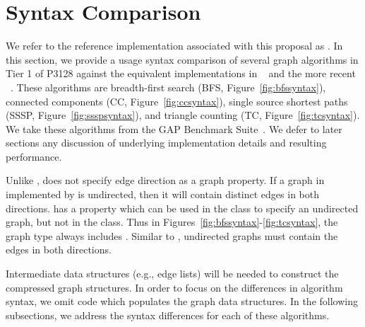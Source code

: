 \clearpage

\section{Syntax Comparison} \label{syntax}
We refer to the reference implementation associated with this proposal as 
\stdgraph. In this section, we provide a usage syntax comparison of several 
graph algorithms in Tier 1 of P3128 against the equivalent implementations in 
\bgl~\cite{BGL} and the more recent \nwgraph~\cite{REF_nwgraph_paper,REF_nwgraph_library}.
These algorithms are breadth-first search (BFS, Figure~\ref{fig:bfssyntax}),
connected components (CC, Figure~\ref{fig:ccsyntax}),
single source shortest paths (SSSP, Figure~\ref{fig:ssspsyntax}),
and triangle counting (TC, Figure~\ref{fig:tcsyntax}).
We take these algorithms from the GAP Benchmark Suite~\cite{beamer2015gap}.
We defer to later sections any discussion of
underlying implementation details and resulting performance.

Unlike \bgl, \stdgraph does not specify edge direction as a graph property.
If a graph in \stdgraph implemented by 
is undirected, then it will contain distinct edges in both directions.
\bgl has a  property
which can be used in the  class
to specify an undirected graph, but
not in the  class.
Thus in Figures~\ref{fig:bfssyntax}-\ref{fig:tcsyntax}, the \bgl graph type 
always includes .
Similar to \stdgraph, undirected graphs must contain the edges in both directions.

Intermediate data structures (e.g., edge lists) will be needed
to construct the compressed graph structures.
In order to focus on the differences in algorithm syntax, we omit
code which populates the graph data structures.
In the following subsections, we address the syntax differences for each of
these algorithms.

